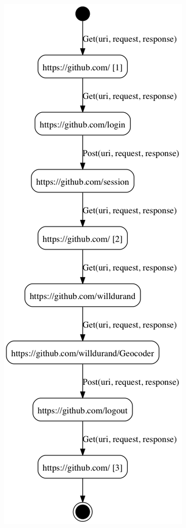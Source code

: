 \begin{figure}[H]
\begin{minipage}{.5\textwidth}
    \includegraphics[width=0.8\linewidth]{figures/gh-iosts-1.png}


\end{minipage}
\end{figure}
